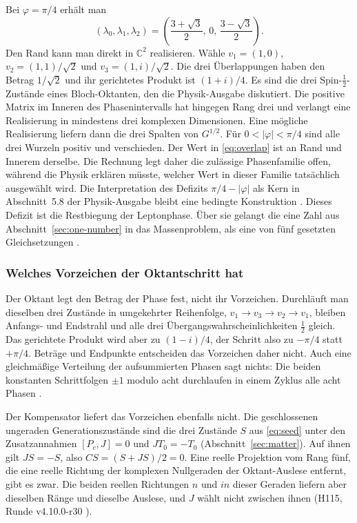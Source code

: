 

Bei \(\varphi=\pi/4\) erhält man
\[
 \left(\lambda_0,\lambda_1,\lambda_2\right)
  =\left(\frac{3+\sqrt3}{2},\,0,\,\frac{3-\sqrt3}{2}\right).
\]
Den Rand kann man direkt in \(\mathbb C^2\) realisieren. Wähle
\(v_1=(1,0)\), \(v_2=(1,1)/\sqrt2\) und
\(v_3=(1,i)/\sqrt2\). Die drei Überlappungen haben den
Betrag \(1/\sqrt2\) und ihr gerichtetes Produkt ist
\((1+i)/4\). Es sind die drei Spin-\(\tfrac12\)-Zustände
eines Bloch-Oktanten, den die Physik-Ausgabe diskutiert.
Die positive Matrix im Inneren des Phasenintervalls hat
hingegen Rang drei und verlangt eine Realisierung in
mindestens drei komplexen Dimensionen. Eine mögliche
Realisierung liefern dann die drei Spalten von \(G^{1/2}\).
Für \(0<|\varphi|<\pi/4\) sind alle drei Wurzeln positiv
und verschieden. Der Wert in \eqref{eq:overlap} ist an
Rand und Innerem derselbe. Die Rechnung legt daher die
zulässige Phasenfamilie offen, während die Physik erklären
müsste, welcher Wert in dieser Familie tatsächlich
ausgewählt wird. Die Interpretation des Defizits
\(\pi/4-|\varphi|\) als Kern in Abschnitt~5.8 der
Physik-Ausgabe bleibt eine bedingte Konstruktion
\cite{physics,companion}. Dieses Defizit ist die Restbiegung der
Leptonphase. Über sie gelangt die eine Zahl aus
Abschnitt~\ref{sec:one-number} in das Massenproblem, als eine von fünf
gesetzten Gleichsetzungen \cite{rootmap,chance}.

\subsubsection{Welches Vorzeichen der Oktantschritt hat}
\label{sec:octant-sign}

Der Oktant legt den Betrag der Phase fest, nicht ihr Vorzeichen. Durchläuft
man dieselben drei Zustände in umgekehrter Reihenfolge,
\(v_1\to v_3\to v_2\to v_1\), bleiben Anfangs- und Endstrahl und alle drei
Übergangswahrscheinlichkeiten \(\tfrac12\) gleich. Das gerichtete Produkt
wird aber zu \((1-i)/4\), der Schritt also zu \(-\pi/4\) statt \(+\pi/4\).
Beträge und Endpunkte entscheiden das Vorzeichen daher nicht. Auch eine
gleichmäßige Verteilung der aufsummierten Phasen sagt nichts: Die beiden
konstanten Schrittfolgen \(\pm1\) modulo acht durchlaufen in einem Zyklus
alle acht Phasen \cite{h116}.

Der Kompensator liefert das Vorzeichen ebenfalls nicht. Die
geschlossenen ungeraden Generationszustände sind die drei Zustände
\(S\) aus \eqref{eq:seed} unter den Zusatzannahmen \([P_c,J]=0\) und
\(JT_0=-T_0\) (Abschnitt~\ref{sec:matter}). Auf ihnen gilt \(JS=-S\), also
\(CS=(S+JS)/2=0\). Eine reelle Projektion vom Rang fünf, die eine reelle
Richtung der komplexen Nullgeraden der Oktant-Auslese entfernt, gibt es
zwar. Die beiden reellen Richtungen \(n\) und \(in\) dieser Geraden liefern
aber dieselben Ränge und dieselbe Auslese, und \(J\) wählt nicht zwischen
ihnen (H115, Runde v4.10.0-r30 \cite{h115}).

